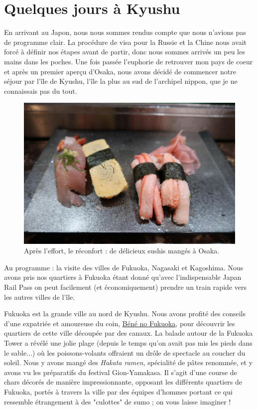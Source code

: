 \hypertarget{quelques-jours-uxe0-kyushu}{%
\section{Quelques jours à Kyushu}\label{quelques-jours-uxe0-kyushu}}

En arrivant au Japon, nous nous sommes rendus compte que nous n'avions
pas de programme clair. La procédure de visa pour la Russie et la Chine
nous avait forcé à définir nos étapes avant de partir, donc nous sommes
arrivés un peu les mains dans les poches. Une fois passée l'euphorie de
retrouver mon pays de coeur et après un premier aperçu d'Osaka, nous
avons décidé de commencer notre séjour par l'île de Kyushu, l'île la
plus au sud de l'archipel nippon, que je ne connaissais pas du tout.

\begin{figure}
\centering
\includegraphics{images/20180709_sushi.JPG}
\caption{Après l'effort, le réconfort : de délicieux sushis mangés à
Osaka.}
\end{figure}

Au programme : la visite des villes de Fukuoka, Nagasaki et Kagoshima.
Nous avons pris nos quartiers à Fukuoka étant donné qu'avec
l'indispensable Japan Rail Pass on peut facilement (et économiquement)
prendre un train rapide vers les autres villes de l'île.

Fukuoka est la grande ville au nord de Kyushu. Nous avons profité des
conseils d'une expatriée et amoureuse du coin,
\href{http://www.benefukuoka.com/2015/12/fukuoka-conseils.html}{Béné no
Fukuoka}, pour découvrir les quartiers de cette ville découpée par des
canaux. La balade autour de la Fukuoka Tower a révélé une jolie plage
(depuis le temps qu'on avait pas mis les pieds dans le sable...) où les
poissons-volants offraient un drôle de spectacle au coucher du soleil.
Nous y avons mangé des \emph{Hakata ramen}, spécialité de pâtes
renommée, et y avons vu les préparatifs du festival Gion-Yamakasa. Il
s'agit d'une course de chars décorés de manière impressionnante,
opposant les différents quartiers de Fukuoka, portés à travers la ville
par des équipes d'hommes portant ce qui ressemble étrangement à des
"culottes" de sumo ; on vous laisse imaginer !

